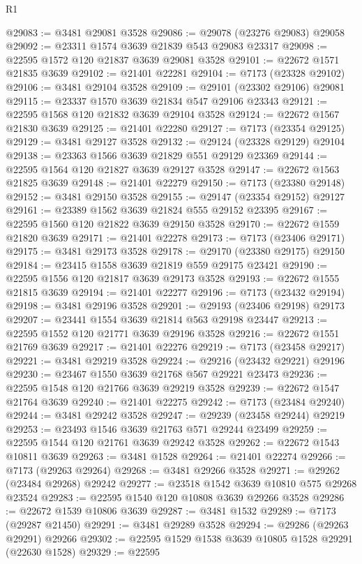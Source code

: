 \begin{lexlean}{R1}
\begin{coremodule}
@29083 := @3481 @29081 @3528
@29086 := @29078 (@23276 @29083) @29058
@29092 := @23311 @1574 @3639 @21839 @543 @29083 @23317
@29098 := @22595 @1572 @120 @21837 @3639 @29081 @3528
@29101 := @22672 @1571 @21835 @3639
@29102 := @21401 @22281
@29104 := @7173 (@23328 @29102)
@29106 := @3481 @29104 @3528
@29109 := @29101 (@23302 @29106) @29081
@29115 := @23337 @1570 @3639 @21834 @547 @29106 @23343
@29121 := @22595 @1568 @120 @21832 @3639 @29104 @3528
@29124 := @22672 @1567 @21830 @3639
@29125 := @21401 @22280
@29127 := @7173 (@23354 @29125)
@29129 := @3481 @29127 @3528
@29132 := @29124 (@23328 @29129) @29104
@29138 := @23363 @1566 @3639 @21829 @551 @29129 @23369
@29144 := @22595 @1564 @120 @21827 @3639 @29127 @3528
@29147 := @22672 @1563 @21825 @3639
@29148 := @21401 @22279
@29150 := @7173 (@23380 @29148)
@29152 := @3481 @29150 @3528
@29155 := @29147 (@23354 @29152) @29127
@29161 := @23389 @1562 @3639 @21824 @555 @29152 @23395
@29167 := @22595 @1560 @120 @21822 @3639 @29150 @3528
@29170 := @22672 @1559 @21820 @3639
@29171 := @21401 @22278
@29173 := @7173 (@23406 @29171)
@29175 := @3481 @29173 @3528
@29178 := @29170 (@23380 @29175) @29150
@29184 := @23415 @1558 @3639 @21819 @559 @29175 @23421
@29190 := @22595 @1556 @120 @21817 @3639 @29173 @3528
@29193 := @22672 @1555 @21815 @3639
@29194 := @21401 @22277
@29196 := @7173 (@23432 @29194)
@29198 := @3481 @29196 @3528
@29201 := @29193 (@23406 @29198) @29173
@29207 := @23441 @1554 @3639 @21814 @563 @29198 @23447
@29213 := @22595 @1552 @120 @21771 @3639 @29196 @3528
@29216 := @22672 @1551 @21769 @3639
@29217 := @21401 @22276
@29219 := @7173 (@23458 @29217)
@29221 := @3481 @29219 @3528
@29224 := @29216 (@23432 @29221) @29196
@29230 := @23467 @1550 @3639 @21768 @567 @29221 @23473
@29236 := @22595 @1548 @120 @21766 @3639 @29219 @3528
@29239 := @22672 @1547 @21764 @3639
@29240 := @21401 @22275
@29242 := @7173 (@23484 @29240)
@29244 := @3481 @29242 @3528
@29247 := @29239 (@23458 @29244) @29219
@29253 := @23493 @1546 @3639 @21763 @571 @29244 @23499
@29259 := @22595 @1544 @120 @21761 @3639 @29242 @3528
@29262 := @22672 @1543 @10811 @3639
@29263 := @3481 @1528
@29264 := @21401 @22274
@29266 := @7173 (@29263 @29264)
@29268 := @3481 @29266 @3528
@29271 := @29262 (@23484 @29268) @29242
@29277 := @23518 @1542 @3639 @10810 @575 @29268 @23524
@29283 := @22595 @1540 @120 @10808 @3639 @29266 @3528
@29286 := @22672 @1539 @10806 @3639
@29287 := @3481 @1532
@29289 := @7173 (@29287 @21450)
@29291 := @3481 @29289 @3528
@29294 := @29286 (@29263 @29291) @29266
@29302 := @22595 @1529 @1538 @3639 @10805 @1528 @29291 (@22630 @1528)
@29329 := @22595

\end{coremodule}
\end{lexlean}
